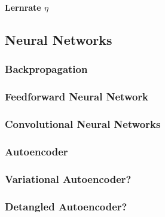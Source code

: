 \documentclass[../main]{subfiles}
\begin{document}
\textbf{Lernrate $\eta$}


 \subsection{Neural Networks}
\subsubsection{Backpropagation}
\subsubsection{Feedforward Neural Network}
\subsubsection{Convolutional Neural Networks}
\subsubsection{Autoencoder}
\subsubsection{Variational Autoencoder?}
\subsubsection{Detangled Autoencoder?}
\end{document}
